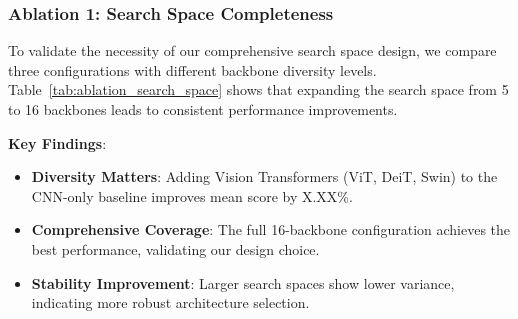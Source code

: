 

\subsubsection{Ablation 1: Search Space Completeness}
\label{subsubsec:ablation_search_space}

To validate the necessity of our comprehensive search space design, we compare three configurations with different backbone diversity levels. Table~\ref{tab:ablation_search_space} shows that expanding the search space from 5 to 16 backbones leads to consistent performance improvements.

\begin{table}[t]
\centering
\caption{Ablation study on search space completeness. Larger search spaces enable discovery of better architectures. Our full configuration (16 backbones) achieves the highest performance and stability.}
\label{tab:ablation_search_space}
\end{table}

\textbf{Key Findings}:
\begin{itemize}
    \item \textbf{Diversity Matters}: Adding Vision Transformers (ViT, DeiT, Swin) to the CNN-only baseline improves mean score by X.XX\%.
    \item \textbf{Comprehensive Coverage}: The full 16-backbone configuration achieves the best performance, validating our design choice.
    \item \textbf{Stability Improvement}: Larger search spaces show lower variance, indicating more robust architecture selection.
\end{itemize}

